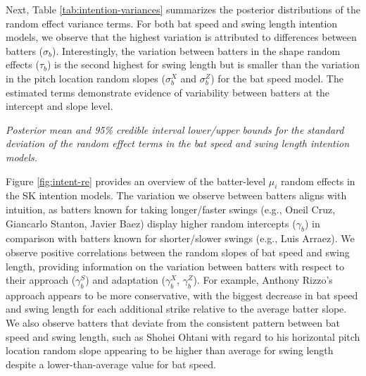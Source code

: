 \documentclass[
  12pt]{article}
\begin{document}
      Next, Table \ref{tab:intention-variances} summarizes the posterior distributions of the random effect variance terms. For both bat speed and swing length intention models, we observe that the highest variation is attributed to differences between batters ($\sigma_b$). Interestingly, the variation between batters in the shape random effects ($\tau_b$) is the second highest for swing length but is smaller than the variation in the pitch location random slopes ($\sigma_b^X$ and $\sigma_b^Z$) for the bat speed model. The estimated terms demonstrate evidence of variability between batters at the intercept and slope level.
       
      \begin{table}[H]
        \centering
        
        \caption{\it Posterior mean and 95\% credible interval lower/upper bounds for the standard deviation of the random effect terms in the bat speed and swing length intention models.}
        \label{tab:intention-variances}
      \end{table}

      Figure \ref{fig:intent-re} provides an overview of the batter-level $\mu_i$ random effects in the SK intention models. The variation we observe between batters aligns with intuition, as batters known for taking longer/faster swings (e.g., Oneil Cruz, Giancarlo Stanton, Javier Baez) display higher random intercepts ($\gamma_b$) in comparison with batters known for shorter/slower swings (e.g., Luis Arraez). We observe positive correlations between the random slopes of bat speed and swing length, providing information on the variation between batters with respect to their approach ($\gamma_b^S$) and adaptation ($\gamma_b^X$, $\gamma_b^Z$). For example, Anthony Rizzo's approach appears to be more conservative, with the biggest decrease in bat speed and swing length for each additional strike relative to the average batter slope. We also observe batters that deviate from the consistent pattern between bat speed and swing length, such as Shohei Ohtani with regard to his horizontal pitch location random slope appearing to be higher than average for swing length despite a lower-than-average value for bat speed. 
      
\end{document}
